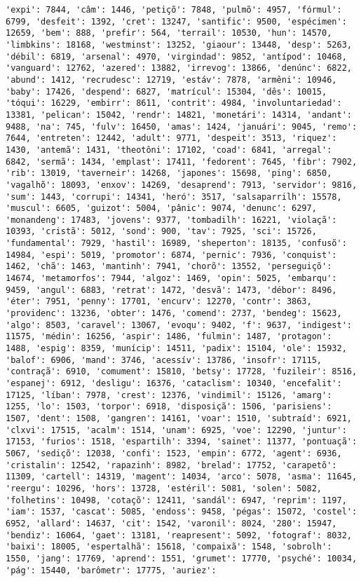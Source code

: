 \documentclass[11pt]{article}
\begin{document}
\begin{Verbatim}[commandchars=\\\{\}]
'expi': 7844, 'câm': 1446, 'petiçõ': 7848, 'pulmõ': 4957, 'fórmul': 6799, 'desfeit': 1392, 'cret': 13247, 'santific': 9500, 'espécimen': 12659, 'bem': 888, 'prefir': 564, 'terrail': 10530, 'hun': 14570, 'limbkins': 18168, 'westminst': 13252, 'giaour': 13448, 'desp': 5263, 'débil': 6819, 'arsenal': 4970, 'virgindad': 9852, 'antípod': 10468, 'vanguard': 12762, 'azered': 13882, 'irrevog': 13866, 'denúnc': 6822, 'abund': 1412, 'recrudesc': 12719, 'estáv': 7878, 'armêni': 10946, 'baby': 17426, 'despend': 6827, 'matrícul': 15304, 'dês': 10015, 'tóqui': 16229, 'embirr': 8611, 'contrit': 4984, 'involuntariedad': 13381, 'pelican': 15042, 'rendr': 14821, 'monetári': 14314, 'andant': 9488, 'na': 745, 'fulv': 16450, 'amas': 1424, 'januári': 9045, 'remo': 7644, 'entreten': 12442, 'adult': 9771, 'despeit': 3513, 'riquez': 1430, 'antemã': 1431, 'theotôni': 17102, 'coad': 6841, 'arregal': 6842, 'sermã': 1434, 'emplast': 17411, 'fedorent': 7645, 'fibr': 7902, 'rib': 13019, 'taverneir': 14268, 'japones': 15698, 'ping': 6850, 'vagalhõ': 18093, 'enxov': 14269, 'desaprend': 7913, 'servidor': 9816, 'sum': 1443, 'corrupi': 14341, 'heró': 3517, 'salsaparrilh': 15578, 'muscul': 6605, 'guizot': 5004, 'pânic': 9074, 'denunc': 6297, 'monandeng': 17483, 'jovens': 9377, 'tombadilh': 16221, 'violaçã': 10393, 'cristã': 5012, 'sond': 900, 'tav': 7925, 'sci': 15726, 'fundamental': 7929, 'hastil': 16989, 'sheperton': 18135, 'confusõ': 14984, 'espi': 5019, 'promotor': 6874, 'pernic': 7936, 'conquist': 1462, 'chã': 1463, 'mantinh': 7941, 'chorõ': 13552, 'perseguiçõ': 14674, 'metamorfos': 7944, 'algoz': 1469, 'opin': 5025, 'embarqu': 9459, 'angul': 6883, 'retrat': 1472, 'desvã': 1473, 'débor': 8496, 'éter': 7951, 'penny': 17701, 'encurv': 12270, 'contr': 3863, 'providenc': 13236, 'obter': 1476, 'comend': 2737, 'bendeg': 15623, 'algo': 8503, 'caravel': 13067, 'evoqu': 9402, 'f': 9637, 'indigest': 11575, 'médin': 16256, 'aspir': 1486, 'fulmin': 1487, 'protagon': 1488, 'espig': 8359, 'munícip': 14511, 'padix': 15104, 'ole': 15932, 'balof': 6906, 'mand': 3746, 'acessív': 13786, 'insofr': 17115, 'contraçã': 6910, 'comument': 15810, 'betsy': 17728, 'fuzileir': 8516, 'espanej': 6912, 'desligu': 16376, 'cataclism': 10340, 'encefalit': 17125, 'líban': 7978, 'crest': 12376, 'vindimil': 15126, 'amarg': 1255, 'lo': 1503, 'torpor': 6918, 'disposiçã': 1506, 'parisiens': 1507, 'dent': 1508, 'gangren': 14161, 'voar': 1510, 'subtraíd': 6921, 'clxvi': 17515, 'acalm': 1514, 'unam': 6925, 'voe': 12290, 'juntur': 17153, 'furios': 1518, 'espartilh': 3394, 'sainet': 11377, 'pontuaçã': 5067, 'sediçõ': 12038, 'confi': 1523, 'empin': 6772, 'agent': 6936, 'cristalin': 12542, 'rapazinh': 8982, 'brelad': 17752, 'carapetõ': 11309, 'cartell': 14319, 'magent': 14034, 'arco': 5078, 'asma': 11645, 'reergu': 10296, 'hors': 13728, 'estéril': 5081, 'solen': 5082, 'folhetins': 10498, 'cotaçõ': 12411, 'sandál': 6947, 'reprim': 1197, 'iam': 1537, 'cascat': 5085, 'endoss': 9458, 'pégas': 15072, 'costel': 6952, 'allard': 14637, 'cit': 1542, 'varonil': 8024, '280': 15947, 'bendiz': 16064, 'gaet': 13181, 'reapresent': 5092, 'fotograf': 8032, 'baixi': 18005, 'espertalhã': 15618, 'compaixã': 1548, 'sobrolh': 1550, 'jang': 17769, 'aprend': 1551, 'grumet': 17770, 'psyché': 10034, 'pág': 15440, 'barômetr': 17775, 'auriez': 
\end{Verbatim}
\end{document}
